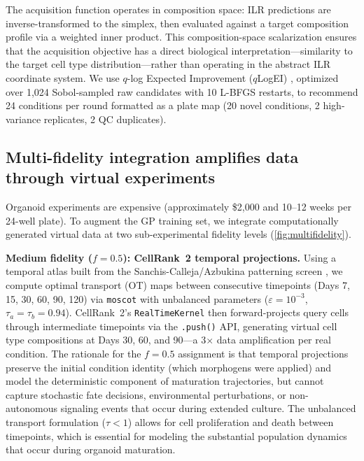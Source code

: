 \documentclass[times,twoside]{zHenriquesLab-StyleBioRxiv}
\begin{document}
The acquisition function operates in composition space: ILR predictions are inverse-transformed to the simplex, then evaluated against a target composition profile via a weighted inner product. This composition-space scalarization ensures that the acquisition objective has a direct biological interpretation---similarity to the target cell type distribution---rather than operating in the abstract ILR coordinate system. We use $q$-log Expected Improvement ($q$LogEI) \cite{Balandat2020botorch}, optimized over 1,024 Sobol-sampled raw candidates with 10 L-BFGS restarts, to recommend 24 conditions per round formatted as a plate map (20 novel conditions, 2 high-variance replicates, 2 QC duplicates).

\subsection*{Multi-fidelity integration amplifies data through virtual experiments}

Organoid experiments are expensive (approximately \$2,000 and 10--12 weeks per 24-well plate). To augment the GP training set, we integrate computationally generated virtual data at two sub-experimental fidelity levels (\cref{fig:multifidelity}).

\textbf{Medium fidelity ($f{=}0.5$): CellRank~2 temporal projections.} Using a temporal atlas built from the Sanchis-Calleja/Azbukina patterning screen \cite{SanchisCalleja2025}, we compute optimal transport (OT) maps between consecutive timepoints (Days 7, 15, 30, 60, 90, 120) via \texttt{moscot} \cite{Klein2025moscot} with unbalanced parameters ($\varepsilon{=}10^{-3}$, $\tau_a{=}\tau_b{=}0.94$). CellRank~2's \texttt{RealTimeKernel} \cite{Weiler2024cellrank2} then forward-projects query cells through intermediate timepoints via the \texttt{.push()} API, generating virtual cell type compositions at Days 30, 60, and 90---a 3$\times$ data amplification per real condition. The rationale for the $f{=}0.5$ assignment is that temporal projections preserve the initial condition identity (which morphogens were applied) and model the deterministic component of maturation trajectories, but cannot capture stochastic fate decisions, environmental perturbations, or non-autonomous signaling events that occur during extended culture. The unbalanced transport formulation ($\tau < 1$) allows for cell proliferation and death between timepoints, which is essential for modeling the substantial population dynamics that occur during organoid maturation.
\end{document}
